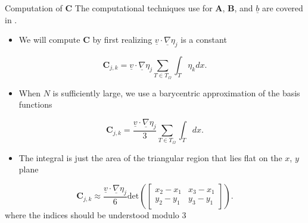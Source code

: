 \documentclass[10pt]{beamer}
\begin{document}
\begin{frame} {Computation of $\mathbf{C}$} \label{ComputationofC}
The computational techniques use for $\mathbf{A}$, $\mathbf{B}$, and $\underline{b}$ are covered in \cite{50LinesofMATLAB}.
\begin{itemize}
\item We will compute $\mathbf{C}$ by first realizing $\underline{v} \cdot \underline{\nabla}\eta_{j}$ is a constant
\end{itemize}
\begin{equation}
\mathbf{C}_{j,k} = \underline{v}\cdot \underline{\nabla}\eta_{j}\sum_{T \in T_{\Omega}}\int_{T}\eta_{k} dx.
\end{equation}

\begin{itemize}
\item When $N$ is sufficiently large, we use a barycentric approximation of the basis functions
\end{itemize}

\begin{equation}
\mathbf{C}_{j,k} = \frac{\underline{v}\cdot \underline{\nabla}\eta_{j}}{3}\sum_{T \in T_{\Omega}}\int_{T} dx.
\end{equation}

\begin{itemize}
\item The integral is just the area of the triangular region that lies flat on the $x$, $y$ plane
\end{itemize}

\begin{equation}
 \mathbf{C}_{j,k}\approx \frac{\underline{v}\cdot \underline{\nabla}\eta_{j}}{6}\text{det}\left(\begin{bmatrix}x_{2}-x_{1} & x_{3}-x_{1} \\ y_{2}-y_{1} & y_{3}-y_{1} \end{bmatrix}\right).
\end{equation}
where the indices should be understood modulo 3

\hyperlink{Questions}{}
\end{frame}
\end{document}
